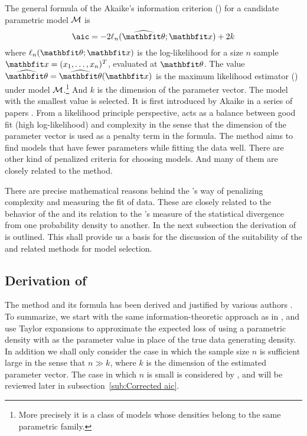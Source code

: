 The general formula of the Akaike's information criterion (\aic) for a
candidate parametric model $\mathcal{M}$ is
\begin{equation}
  \text{\aic} = -2\ell_n(\hbth;\bfx) + 2k
\end{equation}
where $\ell_n(\bth;\bfx)$ is the log-likelihood for a size $n$ sample
$\bfx=(x_1,\dots,x_n)^T$, evaluated at $\bth$. The value $\hbth = \hbth(\bfx)$
is the maximum likelihood estimator (\mle) under model $\mathcal{M}$.\footnote{More
  precisely it is a class of models whose densities belong to the same
  parametric family.} And $k$ is the dimension of the parameter vector. The
model with the smallest \aic value is selected. It is first introduced by
Akaike in a series of papers \parencite{Akaike1973, Akaike1974, Akaike1977,
  Akaike1981}. From a likelihood principle perspective, \aic acts as a balance
between good fit (high log-likelihood) and complexity in the sense that the
dimension of the parameter vector is used as a penalty term in the formula.
The \aic method aims to find models that have fewer parameters while fitting
the data well. There are other kind of penalized criteria for choosing models.
And many of them are closely related to the \aic method.

\firstyear

There are precise mathematical reasons behind the \aic's way of penalizing
complexity and measuring the fit of data. These are closely related to the
behavior of the \mle and its relation to the \textcite{Kullback1951}'s measure
of the statistical divergence from one probability density to another. In the
next subsection the derivation of \aic is outlined. This shall provide us a
basis for the discussion of the suitability of the \aic and related methods
for model selection.

\subsection{Derivation of \protect\aic}
\label{sub:Derivation of aic}

The \aic method and its formula has been derived and justified by various
authors \parencite[e.g.][]{Stone1982, Sawa1978, Chow1981, Bozdogan1987,
  Akaike1973, Claeskens2008}. To summarize, we start with the same
information-theoretic approach as in \textcite{Akaike1973}, and use Taylor
expansions to approximate the expected loss of using a parametric density with
\mle as the parameter value in place of the true data generating density. In
addition we shall only consider the case in which the sample size $n$ is
sufficient large in the sense that $n\gg k$, where $k$ is the dimension of the
estimated parameter vector. The case in which $n$ is small is considered by
\textcite{Hurvich1989}, and will be reviewed later in
subsection~\ref{sub:Corrected aic}.

